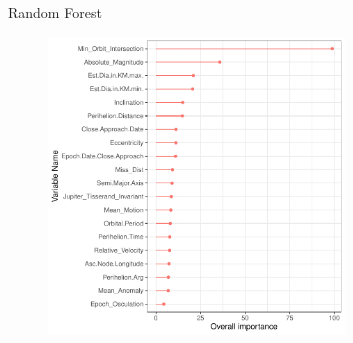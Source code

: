 \documentclass{beamer}
\begin{document}
\begin{frame}{Random Forest}
  \begin{figure}[b]{\textwidth}
    \includegraphics[width=0.7\textwidth]{Pic/RF_Importance.pdf}
  \end{figure} 
\end{frame}
\end{document}
